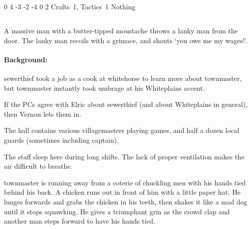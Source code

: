 \begin{multicols}{2}

  {0}%
  {4}%
  {{-3}%
  {-2}%
  {-4}}%
  {0}%
  {2}%
  {Crafts~1, Tactics~1}%
  {Nothing}%
  {}




\subsection{}
\label{whitehorse}

\begin{boxtext}

  A massive man with a butter-tipped moustache throws a lanky man from the door.
  The lanky man recoils with a grimace, and shouts `you owe me my wages!'.

\end{boxtext}

\paragraph{Background:}
\Gls{sewerthief} took a job as a cook at \gls{whitehorse} to learn more about \gls{townmaster}, but \gls{townmaster} instantly took umbrage at his Whiteplains accent.

If the PCs agree with Elric about \gls{sewerthief} (and about Whiteplains in general), then Vernon lets them in.


The hall contains various villagemasters playing games, and half a dozen local guards (sometimes including \gls{captain}).



The staff sleep here during long shifts.  The lack of proper ventilation makes the air difficult to breathe.


\begin{boxtext}

  \Gls{townmaster} is running away from a coterie of chuckling men with his hands tied behind his back.
   A chicken runs out in front of him with a little paper hat.
   He lunges forwards and grabs the chicken in his teeth, then shakes it like a mad dog until it stops squawking.
   He gives a triumphant grin as the crowd clap and another man steps forward to have his hands tied.


\end{boxtext}
\end{multicols}
